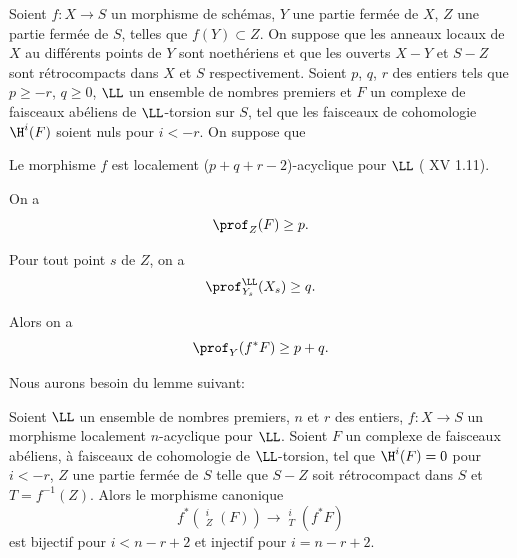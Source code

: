 \begin{theoreme} \label{XIV.1.13}
Soient $f:X\to S$ un morphisme de sch\'emas, $Y$ une partie ferm\'ee de $X$, $Z$ une partie ferm\'ee de $S$, telles que $f(Y)\subset Z$. On suppose que les anneaux locaux de $X$ au diff\'erents points de $Y$ sont noeth\'eriens et que les ouverts $X-Y$ et $S-Z$ sont r\'etrocompacts dans $X$ et $S$ respectivement. Soient $p$, $q$, $r$ des entiers tels que $p\geq -r$, $q\geq 0$, $\LL$ un ensemble de nombres premiers et $F$ un complexe de faisceaux ab\'eliens de $\LL$-torsion sur $S$, tel que les faisceaux de cohomologie $\H^i(F)$ soient nuls pour $i<-r$. On suppose que
\begin{enumeratea}
\item
Le morphisme $f$ est localement ($p+q+r-2$)-acyclique pour $\LL$ \textup{( XV 1.11)}.
\item
On a
$$
\prof_Z(F)\geq p.
$$
\item
Pour tout point $s$ de $Z$, on a
$$
\prof_{Y_s}^{\LL}(X_s)\geq q.
$$
\end{enumeratea}
\noindent
Alors on a
$$
\prof_Y(f^*F)\geq p+q.
$$
\end{theoreme}

Nous aurons besoin du lemme suivant:

\begin{sublemme} \label{XIV.1.13.1}
Soient $\LL$ un ensemble de nombres premiers, $n$ et $r$ des entiers, $f:X\to S$ un morphisme localement $n$-acyclique pour $\LL$. Soient $F$ un complexe de faisceaux ab\'eliens, \`a faisceaux de cohomologie de $\LL$-torsion, tel que $\H^i(F)=0$ pour $i<-r$, $Z$ une partie ferm\'ee de $S$ telle que $S-Z$ soit r\'etrocompact dans $S$ et $T=f^{-1}(Z)$. Alors le morphisme canonique
$$f^*({\mathop{\underline{\mathrm{H}}}\nolimits}_Z^i(F))\to {\mathop{\underline{\mathrm{H}}}\nolimits}_T^i(f^*F)$$
est bijectif pour $i<n-r+2$ et injectif pour $i=n-r+2$.
\end{sublemme}

